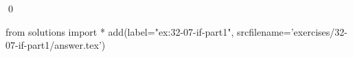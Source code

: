 
\begin{ex}
  \label{ex:32-07-if-part1}
  
  \qed
\end{ex}
\begin{python0}
from solutions import *
add(label="ex:32-07-if-part1",
    srcfilename='exercises/32-07-if-part1/answer.tex')
\end{python0}
